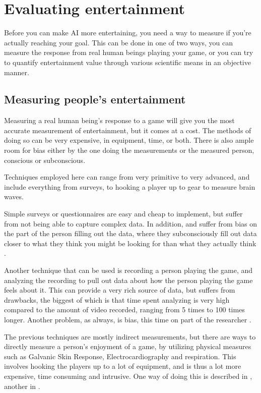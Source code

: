 \section{Evaluating entertainment}
\label{sec:eval-entert}

Before you can make AI more entertaining, you need a way to measure if you're
actually reaching your goal. This can be done in one of two ways, you can
measure the response from real human beings playing your game, or you can try to
quantify entertainment value through various scientific means in an objective
manner.

\subsection{Measuring people's entertainment}
\label{sec:measuring-people}

Measuring a real human being's response to a game will give you the most
accurate measurement of entertainment, but it comes at a cost. The methods of
doing so can be very expensive, in equipment, time, or both. There is also ample
room for bias either by the one doing the measurements or the measured person,
conscious or subconscious.

Techniques employed here can range from very primitive to very advanced, and
include everything from surveys, to hooking a player up to gear to measure brain
waves.

Simple surveys or questionnaires are easy and cheap to implement, but suffer from
not being able to capture complex data. In addition, and suffer from bias on the
part of the person filling out the data, where they subconsciously fill out data
closer to what they think you might be looking for than what they actually think
\citep{mandryk2006using}.

Another technique that can be used is recording a person playing the game, and
analyzing the recording to pull out data about how the person playing the game
feels about it. This can provide a very rich source of data, but suffers from
drawbacks, the biggest of which is that time spent analyzing is very high
compared to the amount of video recorded, ranging from 5 times to 100 times
longer. Another problem, as always, is bias, this time on part of the
researcher \citep{mandryk2006using}.

The previous techniques are mostly indirect measurements, but there are ways to
directly measure a person's enjoyment of a game, by utilizing physical measures
such as Galvanic Skin Response, Electrocardiography and respiration. This
involves hooking the players up to a lot of equipment, and is thus a lot more
expensive, time consuming and intrusive. One way of doing this is described in
\citet{mandryk2006using}, another in \citet{yannakakis2008entertainment}.

